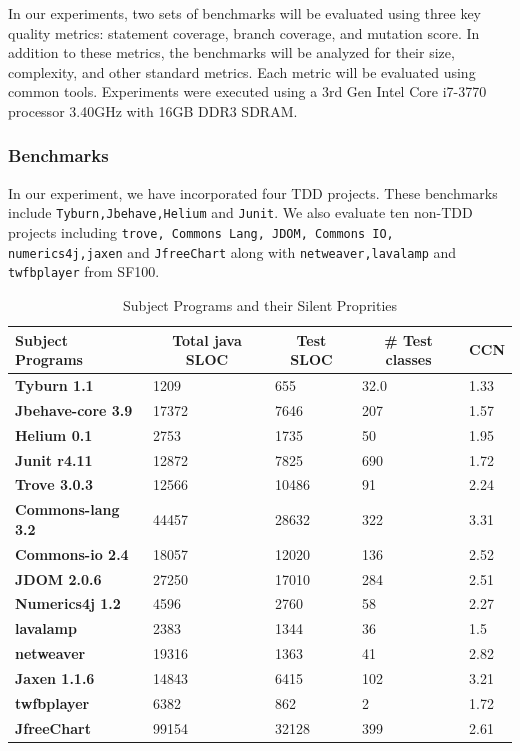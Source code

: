 \documentclass[conference]{IEEEtran}
\begin{document}
In our experiments, two sets of benchmarks will be evaluated using three key quality metrics: statement coverage, branch coverage, and mutation score.  In addition to these metrics, the benchmarks will be analyzed for their size, complexity, and other standard metrics.   Each metric will be evaluated using common tools. Experiments were executed using a 3rd Gen Intel Core i7-3770 processor 3.40GHz with 16GB DDR3 SDRAM.  

\subsubsection{Benchmarks}
	In our experiment, we have incorporated four TDD projects.  These benchmarks include  \texttt{Tyburn,Jbehave,Helium}  and \texttt{Junit}.  We also evaluate ten non-TDD projects including \texttt{trove, Commons Lang, JDOM, Commons IO, numerics4j,jaxen} and \texttt{JfreeChart} along with  \texttt{netweaver,lavalamp} and \texttt{twfbplayer} from SF100.
	
 
\begin{table}[htbp]
\centering 
\caption{Subject Programs and their Silent Proprities}
\label{table:apps-proprities}
\begin{tabular}{ l l l l l }
\hline
\textbf{Subject Programs} & \multicolumn{1}{c}{\textbf{ Total java SLOC}} & \multicolumn{1}{c}{\textbf{Test SLOC}} & \multicolumn{1}{c}{\textbf{\# Test classes}} & \multicolumn{1}{c}{\textbf{CCN}} \\ \hline
\textbf{Tyburn 1.1} & 1209 & 655 & 32.0 & 1.33 \\
\textbf{Jbehave-core 3.9} & 17372 & 7646 & 207 & 1.57 \\
\textbf{Helium 0.1} & 2753 & 1735 & 50 & 1.95 \\
\textbf{Junit r4.11} & 12872 & 7825 & 690 & 1.72 \\
\textbf{Trove 3.0.3} & 12566 & 10486 & 91 & 2.24 \\
\textbf{Commons-lang 3.2} & 44457 & 28632 & 322 & 3.31 \\
\textbf{Commons-io 2.4} & 18057 & 12020 & 136 & 2.52 \\ 
\textbf{JDOM 2.0.6} & 27250 & 17010 & 284 & 2.51 \\ 
\textbf{Numerics4j 1.2} & 4596 & 2760 & 58 & 2.27 \\ 
\textbf{lavalamp} & 2383 & 1344 & 36 & 1.5 \\ 
\textbf{netweaver} & 19316 & 1363 & 41 & 2.82 \\ 
\textbf{Jaxen 1.1.6} & 14843 & 6415 & 102 & 3.21 \\
\textbf{twfbplayer} & 6382 & 862 & 2 & 1.72 \\ 
\textbf{JfreeChart} & 99154 & 32128 & 399 & 2.61 \\ \hline
\end{tabular}
\end{table}
\end{document}
